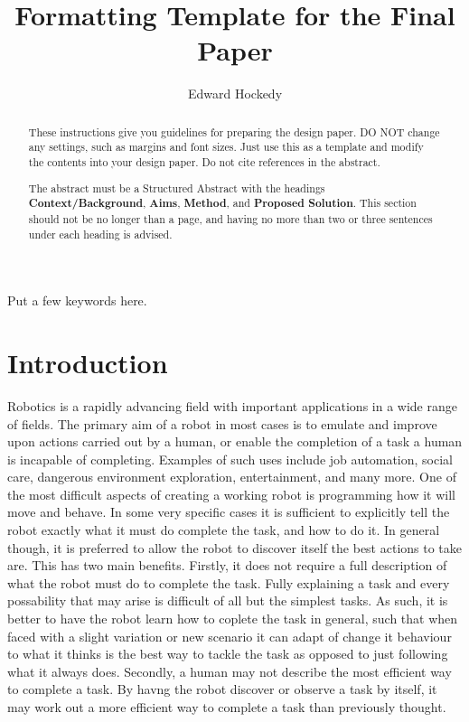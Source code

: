\documentclass[12pt,a4paper]{article}
\title{Formatting Template for the Final Paper}
\author{Edward Hockedy}
\date{}
\begin{document}
\maketitle

\begin{abstract}
These instructions give you guidelines for preparing the design paper.  DO NOT change any settings, such as margins and font sizes.  Just use this as a template and modify the contents into your design paper.  Do not cite references in the abstract.

The abstract must be a Structured Abstract with the headings {\bf Context/Background}, {\bf Aims}, {\bf Method}, and {\bf Proposed Solution}.  This section should not be no longer than a page, and having no more than two or three sentences under each heading is advised.
\end{abstract}

\begin{keywords}
Put a few keywords here.
\end{keywords}

\section{Introduction}
Robotics is a rapidly advancing field with important applications in a wide range of fields. The primary aim of a robot in most cases is to emulate and improve upon actions carried out by a human, or enable the completion of a task a human is incapable of completing. Examples of such uses include job automation, social care, dangerous environment exploration, entertainment, and many more. One of the most difficult aspects of creating a working robot is programming how it will move and behave. In some very specific cases it is sufficient to explicitly tell the robot exactly what it must do complete the task, and how to do it. In general though, it is preferred to allow the robot to discover itself the best actions to take are. This has two main benefits. Firstly, it does not require a full description of what the robot must do to complete the task. Fully explaining a task and every possability that may arise is difficult of all but the simplest tasks. As such, it is better to have the robot learn how to coplete the task in general, such that when faced with a slight variation or new scenario it can adapt of change it behaviour to what it thinks is the best way to tackle the task as opposed to just following what it always does. Secondly, a human may not describe the most efficient way to complete a task. By havng the robot discover or observe a task by itself, it may work out a more efficient way to complete a task than previously thought. 
\end{document}
